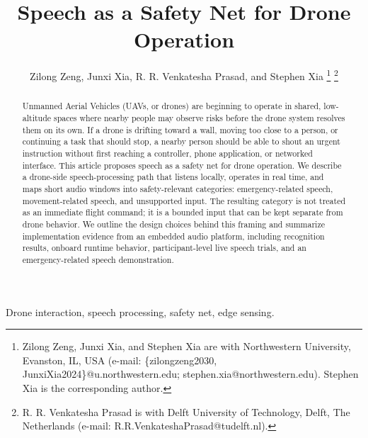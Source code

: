 \documentclass[10pt,journal]{IEEEtran}
\title{Speech as a Safety Net for Drone Operation}
\author{Zilong Zeng, Junxi Xia, R. R. Venkatesha Prasad, and Stephen Xia%
\thanks{Zilong Zeng, Junxi Xia, and Stephen Xia are with Northwestern University, Evanston, IL, USA (e-mail: \{zilongzeng2030, JunxiXia2024\}@u.northwestern.edu; stephen.xia@northwestern.edu). Stephen Xia is the corresponding author.}%
\thanks{R. R. Venkatesha Prasad is with Delft University of Technology, Delft, The Netherlands (e-mail: R.R.VenkateshaPrasad@tudelft.nl).}}
\begin{document}
\maketitle

\begin{abstract}
Unmanned Aerial Vehicles (UAVs, or drones) are beginning to operate in shared, low-altitude spaces where nearby people may observe risks before the drone system resolves them on its own. If a drone is drifting toward a wall, moving too close to a person, or continuing a task that should stop, a nearby person should be able to shout an urgent instruction without first reaching a controller, phone application, or networked interface. This article proposes speech as a safety net for drone operation. We describe a drone-side speech-processing path that listens locally, operates in real time, and maps short audio windows into safety-relevant categories: emergency-related speech, movement-related speech, and unsupported input. The resulting category is not treated as an immediate flight command; it is a bounded input that can be kept separate from drone behavior. We outline the design choices behind this framing and summarize implementation evidence from an embedded audio platform, including recognition results, onboard runtime behavior, participant-level live speech trials, and an emergency-related speech demonstration.
\end{abstract}

\begin{IEEEkeywords}
Drone interaction, speech processing, safety net, edge sensing.
\end{IEEEkeywords}









\end{document}
